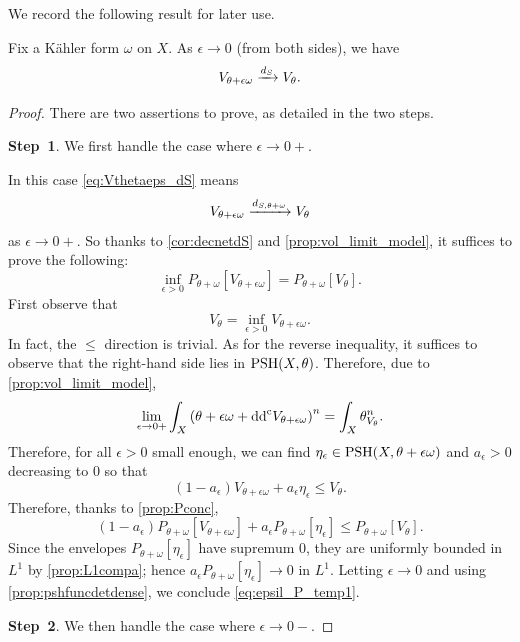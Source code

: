 We record the following result for later use.
\begin{lemma}\label{lma:Vthetaepsconv}
Fix a Kähler form $\omega$ on $X$.
As $\epsilon\to 0$ (from both sides), we have
\begin{equation}\label{eq:Vthetaeps_dS}
    V_{\theta+\epsilon\omega}\xrightarrow[]{d_S}V_{\theta}.
\end{equation}
\end{lemma}
\begin{proof}
There are two assertions to prove, as detailed in the two steps.

\textbf{Step~1}. We first handle the case where $\epsilon\to 0+$.

In this case \eqref{eq:Vthetaeps_dS} means
\[
    V_{\theta+\epsilon\omega}\xrightarrow[]{d_{S,\theta+\omega}}V_{\theta}
\]
as $\epsilon\to 0+$. So thanks to \cref{cor:decnetdS} and \cref{prop:vol_limit_model}, it suffices to prove the following:
\begin{equation}\label{eq:epsil_P_temp1}
    \inf_{\epsilon>0} P_{\theta+\omega}\left[ V_{\theta+\epsilon\omega} \right]=P_{\theta+\omega}\left[ V_{\theta} \right].
\end{equation}
First observe that
\[
V_{\theta}=\inf_{\epsilon>0} V_{\theta+\epsilon\omega}.
\]
In fact, the $\leq$ direction is trivial. As for the reverse inequality, it suffices to observe that the right-hand side lies in $\mathrm{PSH}(X,\theta)$.
Therefore, due to \cref{prop:vol_limit_model},
\[
\lim_{\epsilon \to 0+} \int_X \left( \theta+\epsilon\omega+\mathrm{dd}^{\mathrm{c}} V_{\theta+\epsilon\omega} \right)^n=\int_X \theta_{V_{\theta}}^n.
\]
Therefore, for all $\epsilon>0$ small enough, we can find $\eta_{\epsilon}\in \mathrm{PSH}(X,\theta+\epsilon\omega)$ and $a_{\epsilon}>0$ decreasing to $0$ so that
\[
(1-a_\epsilon)V_{\theta+\epsilon \omega} + a_\epsilon \eta_\epsilon \leq V_{\theta}.
\]
Therefore, thanks to \cref{prop:Pconc},
\[
(1-a_\epsilon)P_{\theta+\omega}\left[ V_{\theta+\epsilon \omega} \right] + a_\epsilon P_{\theta+\omega}\left[\eta_\epsilon\right] \leq P_{\theta+\omega}\left[V_{\theta}\right].
\]
Since the envelopes $P_{\theta+\omega}[\eta_\epsilon]$ have supremum $0$, they are uniformly bounded in $L^1$ by \cref{prop:L1compa}; hence $a_\epsilon P_{\theta+\omega}[\eta_\epsilon]\to 0$ in $L^1$. Letting $\epsilon\to 0$ and using \cref{prop:pshfuncdetdense}, we conclude \eqref{eq:epsil_P_temp1}.

\textbf{Step~2}. We then handle the case where $\epsilon\to 0-$.


\end{proof}
